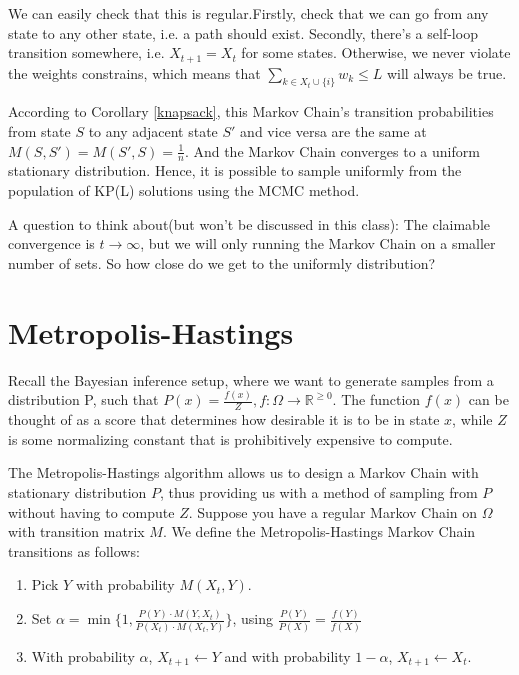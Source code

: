 \documentclass[twoside]{article}
\begin{document}
We can easily check that this is regular.Firstly, check that we can go from any state to any other state, i.e. a path should exist. Secondly, there's a self-loop transition somewhere, i.e. $X_{t+1}=X_t$ for some states. Otherwise, we never violate the weights constrains, which means that $\sum_{k \in X_t \cup \{i\}} w_k \leq L $ will always be true.

According to Corollary \ref{knapsack}, this Markov Chain's transition probabilities from state $S$ to any adjacent state $S'$ and vice versa are the same at $M(S, S') = M(S', S) = \frac{1}{n}$. And the Markov Chain converges to a uniform stationary distribution. Hence, it is possible to sample uniformly from the population of KP(L) solutions using the MCMC method.

A question to think about(but won't be discussed in this class): The claimable convergence is $t \rightarrow \infty$, but we will only running the Markov Chain on a smaller number of sets. So how close do we get to the uniformly distribution?






\section{Metropolis-Hastings}

Recall the Bayesian inference setup, where we want to generate samples from a distribution P, such that $P(x) = \frac{f(x)}{Z}, f: \Omega \rightarrow \mathbb{R}^{\geq 0}$. The function $f(x)$ can be thought of as a score that determines how desirable it is to be in state $x$, while $Z$ is some normalizing constant that is prohibitively expensive to compute. 

The Metropolis-Hastings algorithm allows us to design a Markov Chain with stationary distribution $P$, thus providing us with a method of sampling from $P$ without having to compute $Z$. Suppose you have a regular Markov Chain on $\Omega$ with transition matrix $M$. We define the Metropolis-Hastings Markov Chain transitions as follows:

\begin{enumerate}
   \item Pick $Y$ with probability $M(X_t, Y)$.
   \item Set $\alpha = \min\{ 1, \frac{P(Y) \cdot M(Y, X_t)}{P(X_t) \cdot M(X_t, Y)} \}$, using $\frac{P(Y)}{P(X)} = \frac{f(Y)}{f(X)}$
   \item With probability $\alpha$, $X_{t+1} \leftarrow Y$ and with probability $1 - \alpha$, $X_{t+1} \leftarrow X_t$.
\end{enumerate}
\end{document}
